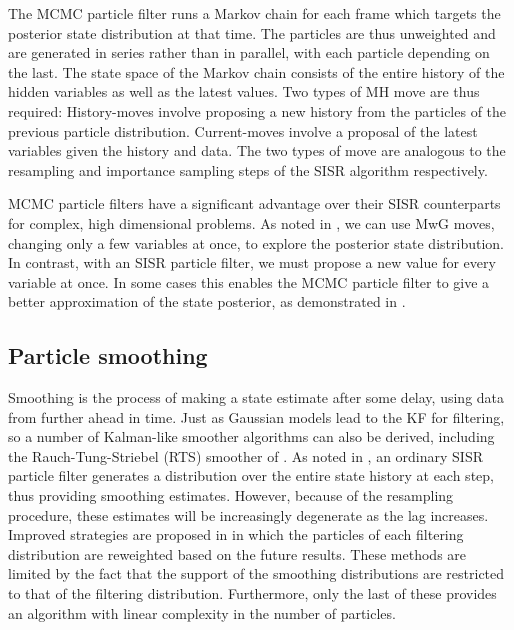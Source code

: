 The MCMC particle filter runs a Markov chain for each frame which targets the posterior state distribution at that time. The particles are thus unweighted and are generated in series rather than in parallel, with each particle depending on the last. The state space of the Markov chain consists of the entire history of the hidden variables as well as the latest values. Two types of MH move are thus required: History-moves involve proposing a new history from the particles of the previous particle distribution. Current-moves involve a proposal of the latest variables given the history and data. The two types of move are analogous to the resampling and importance sampling steps of the SISR algorithm respectively.

MCMC particle filters have a significant advantage over their SISR counterparts for complex, high dimensional problems. As noted in \cite{Pang2008}, we can use MwG moves, changing only a few variables at once, to explore the posterior state distribution. In contrast, with an SISR particle filter, we must propose a new value for every variable at once. In some cases this enables the MCMC particle filter to give a better approximation of the state posterior, as demonstrated in \cite{Pang2011}.



\subsection{Particle smoothing}
Smoothing is the process of making a state estimate after some delay, using data from further ahead in time. Just as Gaussian models lead to the KF for filtering, so a number of Kalman-like smoother algorithms can also be derived, including the Rauch-Tung-Striebel (RTS) smoother of \cite{Rauch1965}. As noted in \cite{Kitagawa1996}, an ordinary SISR particle filter generates a distribution over the entire state history at each step, thus providing smoothing estimates. However, because of the resampling procedure, these estimates will be increasingly degenerate as the lag increases. Improved strategies are proposed in \cite{Clapp1999,Doucet2000a,Godsill2004} in which the particles of each filtering distribution are reweighted based on the future results. These methods are limited by the fact that the support of the smoothing distributions are restricted to that of the filtering distribution. Furthermore, only the last of these provides an algorithm with linear complexity in the number of particles.

